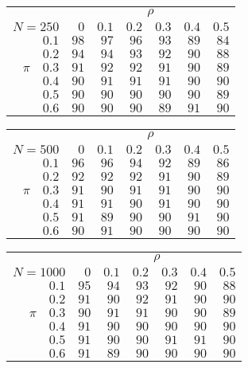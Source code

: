 \begin{tabular}{r|rrrrrr}
\hline\hline
 &\multicolumn{6}{c}{$\rho$} \\ 
 $N = 250$ & $0$ & $0.1$ & $0.2$ & $0.3$ & $0.4$ & $0.5$ \\ 
 \hline$0.1$ & $98$ & $97$ & $96$ & $93$ & $89$ & $84$\\ 
$0.2$ & $94$ & $94$ & $93$ & $92$ & $90$ & $88$\\ 
$\pi\quad$$0.3$ & $91$ & $92$ & $92$ & $91$ & $90$ & $89$\\ 
$0.4$ & $90$ & $91$ & $91$ & $91$ & $90$ & $90$\\ 
$0.5$ & $90$ & $90$ & $90$ & $90$ & $90$ & $89$\\ 
$0.6$ & $90$ & $90$ & $90$ & $89$ & $91$ & $90$\\ 
 \hline 
 \end{tabular}
 
 \vspace{2em} 
 
\begin{tabular}{r|rrrrrr}
\hline\hline
 &\multicolumn{6}{c}{$\rho$} \\ 
 $N = 500$ & $0$ & $0.1$ & $0.2$ & $0.3$ & $0.4$ & $0.5$ \\ 
 \hline$0.1$ & $96$ & $96$ & $94$ & $92$ & $89$ & $86$\\ 
$0.2$ & $92$ & $92$ & $92$ & $91$ & $90$ & $89$\\ 
$\pi\quad$$0.3$ & $91$ & $90$ & $91$ & $91$ & $90$ & $90$\\ 
$0.4$ & $91$ & $91$ & $90$ & $91$ & $90$ & $90$\\ 
$0.5$ & $91$ & $89$ & $90$ & $90$ & $91$ & $90$\\ 
$0.6$ & $90$ & $91$ & $90$ & $90$ & $90$ & $90$\\ 
 \hline 
 \end{tabular}
 
 \vspace{2em} 
 
\begin{tabular}{r|rrrrrr}
\hline\hline
 &\multicolumn{6}{c}{$\rho$} \\ 
 $N = 1000$ & $0$ & $0.1$ & $0.2$ & $0.3$ & $0.4$ & $0.5$ \\ 
 \hline$0.1$ & $95$ & $94$ & $93$ & $92$ & $90$ & $88$\\ 
$0.2$ & $91$ & $90$ & $92$ & $91$ & $90$ & $90$\\ 
$\pi\quad$$0.3$ & $90$ & $91$ & $91$ & $90$ & $90$ & $89$\\ 
$0.4$ & $91$ & $90$ & $90$ & $90$ & $90$ & $90$\\ 
$0.5$ & $91$ & $90$ & $90$ & $91$ & $91$ & $90$\\ 
$0.6$ & $91$ & $89$ & $90$ & $90$ & $90$ & $90$\\ 
 \hline 
 \end{tabular}